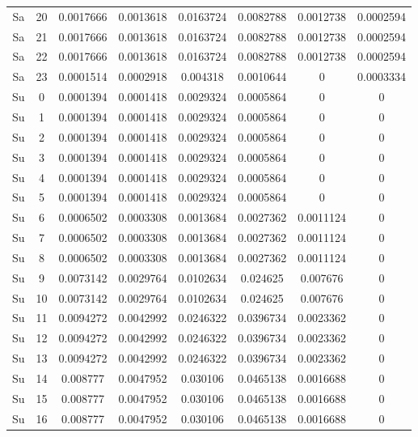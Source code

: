 \begin{center}
\begin{longtable}{cccccccc}
          Sa & 20 & 0.0017666 & 0.0013618 & 0.0163724 & 0.0082788 & 0.0012738 & 0.0002594 \\  
          Sa & 21 & 0.0017666 & 0.0013618 & 0.0163724 & 0.0082788 & 0.0012738 & 0.0002594 \\  
          Sa & 22 & 0.0017666 & 0.0013618 & 0.0163724 & 0.0082788 & 0.0012738 & 0.0002594 \\  
          Sa & 23 & 0.0001514 & 0.0002918 & 0.004318 & 0.0010644 & 0 & 0.0003334 \\  
         Su & 0 & 0.0001394 & 0.0001418 & 0.0029324 & 0.0005864 & 0 & 0 \\  
         Su & 1 & 0.0001394 & 0.0001418 & 0.0029324 & 0.0005864 & 0 & 0 \\  
         Su & 2 & 0.0001394 & 0.0001418 & 0.0029324 & 0.0005864 & 0 & 0 \\  
         Su & 3 & 0.0001394 & 0.0001418 & 0.0029324 & 0.0005864 & 0 & 0 \\  
         Su & 4 & 0.0001394 & 0.0001418 & 0.0029324 & 0.0005864 & 0 & 0 \\  
         Su & 5 & 0.0001394 & 0.0001418 & 0.0029324 & 0.0005864 & 0 & 0 \\  
         Su & 6 & 0.0006502 & 0.0003308 & 0.0013684 & 0.0027362 & 0.0011124 & 0 \\  
         Su & 7 & 0.0006502 & 0.0003308 & 0.0013684 & 0.0027362 & 0.0011124 & 0 \\  
         Su & 8 & 0.0006502 & 0.0003308 & 0.0013684 & 0.0027362 & 0.0011124 & 0 \\  
         Su & 9 & 0.0073142 & 0.0029764 & 0.0102634 & 0.024625 & 0.007676 & 0 \\  
         Su & 10 & 0.0073142 & 0.0029764 & 0.0102634 & 0.024625 & 0.007676 & 0 \\  
         Su & 11 & 0.0094272 & 0.0042992 & 0.0246322 & 0.0396734 & 0.0023362 & 0 \\  
         Su & 12 & 0.0094272 & 0.0042992 & 0.0246322 & 0.0396734 & 0.0023362 & 0 \\  
         Su & 13 & 0.0094272 & 0.0042992 & 0.0246322 & 0.0396734 & 0.0023362 & 0 \\  
         Su & 14 & 0.008777 & 0.0047952 & 0.030106 & 0.0465138 & 0.0016688 & 0 \\  
         Su & 15 & 0.008777 & 0.0047952 & 0.030106 & 0.0465138 & 0.0016688 & 0 \\  
         Su & 16 & 0.008777 & 0.0047952 & 0.030106 & 0.0465138 & 0.0016688 & 0 \\  

\end{longtable}
\end{center}
